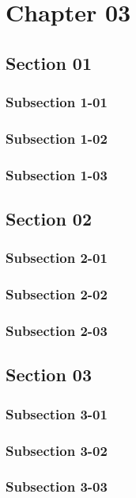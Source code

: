 \chapter{Chapter 03}

\bt

\section{Section 01}
\bt
\subsection{Subsection 1-01}
\bt
\subsection{Subsection 1-02}
\bt
\subsection{Subsection 1-03}
\bt

\section{Section 02}
\bt
\subsection{Subsection 2-01}
\bt
\subsection{Subsection 2-02}
\bt
\subsection{Subsection 2-03}
\bt

\section{Section 03}
\bt
\subsection{Subsection 3-01}
\bt
\subsection{Subsection 3-02}
\bt
\subsection{Subsection 3-03}
\bt
